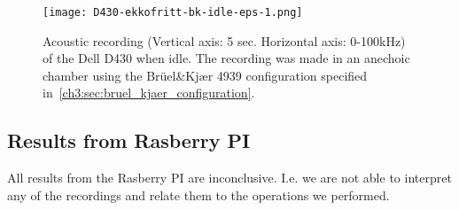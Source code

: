 
\begin{figure}[ht]
    \centering
    \texttt{[image: D430-ekkofritt-bk-idle-eps-1.png]}
    \caption{Acoustic recording (Vertical axis: 5 sec. Horizontal axis: 0-100kHz) of the Dell D430 when idle. The recording was made in an anechoic chamber using the Brüel\&Kjær 4939 configuration specified in~\autoref{ch3:sec:bruel_kjaer_configuration}. }
    \label{fig:D430-ekkofritt-bk-idle-eps-1}
\end{figure}

\subsection{Results from Rasberry PI}\label{subsec:rb_bk_results}
All results from the Rasberry PI are inconclusive. 
I.e. we are not able to interpret any of the recordings and relate them to the operations we performed.